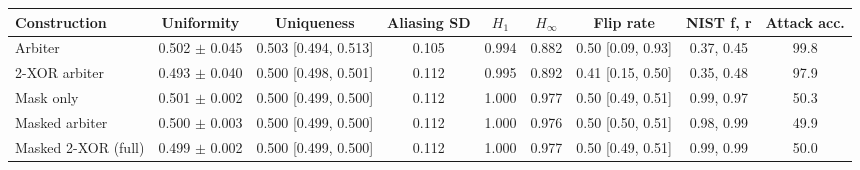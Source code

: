 \begin{tabular}{lcccccccc}
\toprule
Construction & Uniformity & Uniqueness & Aliasing SD & $H_1$ & $H_\infty$ & Flip rate & NIST f, r & Attack acc. \\
\midrule
Arbiter & 0.502 $\pm$ 0.045 & 0.503 [0.494, 0.513] & 0.105 & 0.994 & 0.882 & 0.50 [0.09, 0.93] & 0.37, 0.45 & 99.8 \\
2-XOR arbiter & 0.493 $\pm$ 0.040 & 0.500 [0.498, 0.501] & 0.112 & 0.995 & 0.892 & 0.41 [0.15, 0.50] & 0.35, 0.48 & 97.9 \\
Mask only & 0.501 $\pm$ 0.002 & 0.500 [0.499, 0.500] & 0.112 & 1.000 & 0.977 & 0.50 [0.49, 0.51] & 0.99, 0.97 & 50.3 \\
Masked arbiter & 0.500 $\pm$ 0.003 & 0.500 [0.499, 0.500] & 0.112 & 1.000 & 0.976 & 0.50 [0.50, 0.51] & 0.98, 0.99 & 49.9 \\
Masked 2-XOR (full) & 0.499 $\pm$ 0.002 & 0.500 [0.499, 0.500] & 0.112 & 1.000 & 0.977 & 0.50 [0.49, 0.51] & 0.99, 0.99 & 50.0 \\
\bottomrule
\end{tabular}

